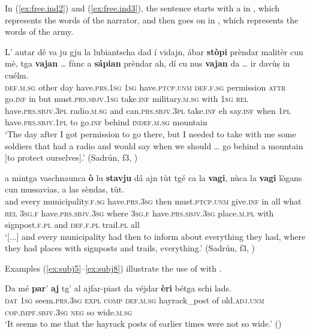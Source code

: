 In (\ref{ex:free.ind2}) and (\ref{ex:free.ind3}), the sentence starts with a  in , which represents the words of the narrator, and then goes on in , which represents the words of the army.

\ea
\label{ex:free.ind2}
\gll  L’ autar dé va ju gju la lubiantscha dad í vidajn, ábar \textbf{stòpi} prèndar malitèr cun mè, tga \textbf{vajan} … fùnc a \textbf{sápian} prèndar ah, dí cu nus \textbf{vajan} da … ir davùṣ in cuélm.\\
\textsc{def.m.sg} other day have.\textsc{prs.1sg} \textsc{1sg} have.\textsc{ptcp.unm} \textsc{def.f.sg} permission \textsc{attr} go.\textsc{inf} in but must.\textsc{prs.sbjv.1sg}  take.\textsc{inf} military.\textsc{m.sg} with \textsc{1sg} \textsc{rel} have.\textsc{prs.sbjv.3pl} {} radio.\textsc{m.sg} and can.\textsc{prs.sbjv.3pl} take.\textsc{inf} eh say.\textsc{inf} when \textsc{1pl} have.\textsc{prs.sbjv.1pl} to {} go.\textsc{inf} behind \textsc{indef.m.sg} mountain\\
\glt `The day after I got permission to go there, but I needed to take with me some soldiers that had a radio and would say when we should … go behind a mountain [to protect ourselves].' (Sadrún, f3, )
\z

\ea
\label{ex:free.ind3}
\gll [...] a mintga vaschnaunca \textbf{ò} lu \textbf{stavju} dá ajn tùt tgé ca la \textbf{vagi}, nùca la \textbf{vagi} lògans cun mussavias, a las sèndas, tùt.\\
{} and every municipality.\textsc{f.sg} have.\textsc{prs.3sg} then must.\textsc{ptcp.unm} give.\textsc{inf} in all what \textsc{rel} \textsc{3sg.f} have.\textsc{prs.sbjv.3sg} where \textsc{3sg.f} have.\textsc{prs.sbjv.3sg} place.\textsc{m.pl} with signpost.\textsc{f.pl} and \textsc{def.f.pl} trail.\textsc{pl} all \\
\glt `[...] and every municipality had then to inform about everything they had, where they had places with signposts and trails, everything.' (Sadrún, f3, )
\z

Examples (\ref{ex:subj5}--\ref{ex:subj8}) illustrate the use of  with .

\ea
\label{ex:subj5}
\gll  Da mé \textbf{par}' \textbf{aj} tg' al ajfar-piast da véjdar \textbf{èri} bétga schi lads.\\
\textsc{dat} \textsc{1sg} seem.\textsc{prs.3sg} \textsc{expl} \textsc{comp} \textsc{def.m.sg} hayrack\_post  of old.\textsc{adj.unm} \textsc{cop.impf.sbjv.3sg} \textsc{neg} so wide.\textsc{m.sg} \\
\glt `It seems to me that the hayrack posts of earlier times were not so wide.' ()
\z

